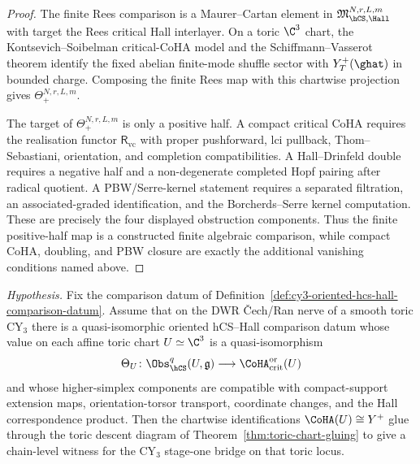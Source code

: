 \begin{proof}
The finite Rees comparison is a Maurer--Cartan element in
$\mathfrak M_{\hCS,\Hall}^{N,r,L,m}$ with target the Rees critical Hall
interlayer. On a toric $\C^3$ chart, the Kontsevich--Soibelman
critical-CoHA model and the Schiffmann--Vasserot theorem identify the
fixed abelian finite-mode shuffle sector with
$Y_T^+(\ghat)$ in bounded charge. Composing the finite Rees map with
this chartwise projection gives $\Theta_{+}^{N,r,L,m}$.

The target of $\Theta_{+}^{N,r,L,m}$ is only a positive half. A compact
critical CoHA requires the realisation functor
$\mathsf R_{\mathrm{vc}}$ with proper pushforward, lci pullback,
Thom--Sebastiani, orientation, and completion compatibilities. A
Hall--Drinfeld double requires a negative half and a non-degenerate
completed Hopf pairing after radical quotient. A PBW/Serre-kernel
statement requires a separated filtration, an associated-graded
identification, and the Borcherds--Serre kernel computation. These are
precisely the four displayed obstruction components. Thus the finite
positive-half map is a constructed finite algebraic comparison, while
compact CoHA, doubling, and PBW closure are exactly the additional
vanishing conditions named above.
\end{proof}

\begin{proposition}
\label{prop:cy3-local-to-toric-descent-package}
\noindent\emph{Hypothesis.} Fix the comparison datum of
Definition~\ref{def:cy3-oriented-hcs-hall-comparison-datum}.
Assume that on the DWR \v{C}ech/Ran nerve of a smooth toric CY$_3$
there is a quasi-isomorphic oriented hCS--Hall comparison datum whose
value on each affine toric chart $U\simeq\C^3$ is a quasi-isomorphism
\[
 \Theta_U\colon
 \Obs_{\hCS}^{q}(U,\mathfrak g)
 \longrightarrow
 \CoHA_{\mathrm{crit}}^{\mathrm{or}}(U)
\]
and whose higher-simplex components are compatible with compact-support
extension maps, orientation-torsor transport, coordinate changes, and
the Hall correspondence product. Then the chartwise identifications
$\CoHA(U)\cong Y^+$ glue through the toric descent diagram of
Theorem~\ref{thm:toric-chart-gluing} to give a chain-level witness for
the CY$_3$ stage-one bridge on that toric locus.
\end{proposition}

